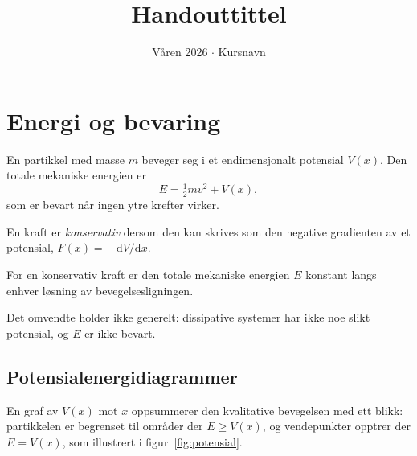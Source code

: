 \documentclass[11pt]{article}
\title{Handouttittel}
\date{Våren 2026 $\cdot$ Kursnavn}
\begin{document}
\maketitle


\section{Energi og bevaring}

En partikkel med masse $m$ beveger seg i et endimensjonalt
potensial $V(x)$. Den totale mekaniske energien er
\begin{equation}
  E = \tfrac{1}{2} m v^2 + V(x),
\end{equation}
som er bevart når ingen ytre krefter virker.

\begin{viktig}
\begin{definisjon}
En kraft er \emph{konservativ} dersom den kan skrives som den
negative gradienten av et potensial, $F(x) = -\,\mathrm{d}V/\mathrm{d}x$.
\end{definisjon}
\end{viktig}

\begin{hovedresultat}[Energibevaring]
\begin{teorem}
For en konservativ kraft er den totale mekaniske energien $E$
konstant langs enhver løsning av bevegelsesligningen.
\end{teorem}
\end{hovedresultat}

\begin{merknad}
Det omvendte holder ikke generelt: dissipative systemer har
ikke noe slikt potensial, og $E$ er ikke bevart.
\end{merknad}

\subsection{Potensialenergidiagrammer}

En graf av $V(x)$ mot $x$ oppsummerer den kvalitative bevegelsen
med ett blikk: partikkelen er begrenset til områder der
$E \ge V(x)$, og vendepunkter opptrer der $E = V(x)$,
som illustrert i figur~\ref{fig:potensial}.
\end{document}
